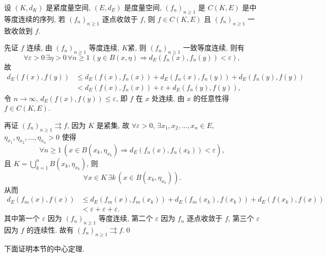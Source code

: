      \begin{Theorem}
          设 $ (K, d_{K}) $ 是紧度量空间, $ (E, d_{E}) $ 是度量空间,  $ (f_{n})_{n\geqslant1} $ 是 $ C(K, E) $ 是中等度连续的序列, 若 $ (f_{n})_{n\geqslant1} $ 逐点收敛于 $ f $, 则 $ f\in C(K, E) $ 且 $ (f_{n})_{n\geqslant1} $ 一致收敛到 $ f $.
     \end{Theorem}
     \begin{Proof}
          先证 $ f $ 连续, 由 $ (f_{n})_{n\geqslant1} $ 等度连续, $ K $紧, 则 $ (f_{n})_{n\geqslant1} $ 一致等度连续, 则有
          \[
               \forall \varepsilon>0\,\exists\eta>0\,\forall n\geqslant1\,(y\in B(x, \eta)\Rightarrow d_{E}(f_{n}(x), f_{n}(y))<\varepsilon),
          \]
          故
          \[
               \begin{aligned}
               d_{E}(f(x), f(y)) & \leqslant d_{E}(f(x), f_{n}(x))+d_{E}(f_{n}(x), f_{n}(y))+d_{E}(f_{n}(y), f(y))\\
               & < d_{E}(f(x), f_{n}(x))+\varepsilon+d_{E}(f_{n}(y), f(y)),
               \end{aligned}
          \]
          令 $ n\to\infty $, $ d_{E}(f(x), f(y))\leqslant\varepsilon $, 即 $ f $ 在 $ x $ 处连续, 由 $ x $ 的任意性得 $ f\in C(K, E) $.

          再证 $ (f_{n})_{n\geqslant1}\rightrightarrows f $, 因为 $ K $ 是紧集, 故 $ \forall \varepsilon>0 $, $ \exists x_{1}, x_{2}, \dots, x_{n}\in E $, $ \eta_{x_{1}}, \eta_{x_{2}}, \dots , \eta_{x_{n}}>0 $ 使得 
          \[
               \forall n\geqslant1\,(x\in B(x_{k}, \eta_{x_{k}})\Rightarrow d_{E}(f_{n}(x), f_{n}(x_{k}))<\varepsilon), 
          \]
          且 $ K=\bigcup_{k=1}^{n}B(x_{k}, \eta_{x_{k}}) $, 则
          \[
               \forall x\in K\,\exists k\,(x\in B(x_{k}, \eta_{x_{k}})).
          \]
          从而
          \[
               \begin{aligned}
                   d_{E}(f_{m}(x), f(x)) & \leqslant d_{E}(f_{m}(x), f_{m}(x_{k}))+d_{E}(f_{m}(x_{k}), f(x_{k}))+d_{E}(f(x_{k}), f(x))\\
                   & <\varepsilon+\varepsilon+\varepsilon.
               \end{aligned}
          \]
          其中第一个 $ \varepsilon $ 因为 $ (f_{n})_{n\geqslant1} $ 等度连续, 第二个 $ \varepsilon $ 因为 $ f_{n} $ 逐点收敛于 $ f $, 第三个 $ \varepsilon $ 因为 $ f $ 的连续性. 故有 $ (f_{n})_{n\geqslant1}\rightrightarrows f $.\qed
     \end{Proof}

     下面证明本节的中心定理.

